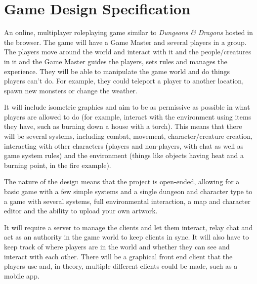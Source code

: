 \chapter{Game Design Specification}\label{appendix:designspec}

An online, multiplayer roleplaying game similar to \textit{Dungeons \& Dragons} hosted in the browser. The game will have a Game Master and several players in a group. The players move around the world and interact with it and the people/creatures in it and the Game Master guides the players, sets rules and manages the experience. They will be able to manipulate the game world and do things players can't do. For example, they could teleport a player to another location, spawn new monsters or change the weather.

It will include isometric graphics and aim to be as permissive as possible in what players are allowed to do (for example, interact with the environment using items they have, such as burning down a house with a torch). This means that there will be several systems, including combat, movement, character/creature creation, interacting with other characters (players and non-players, with chat as well as game system rules) and the environment (things like objects having heat and a burning point, in the fire example).

The nature of the design means that the project is open-ended, allowing for a basic game with a few simple systems and a single dungeon and character type to a game with several systems, full environmental interaction, a map and character editor and the ability to upload your own artwork.

It will require a server to manage the clients and let them interact, relay chat and act as an authority in the game world to keep clients in sync. It will also have to keep track of where players are in the world and whether they can see and interact with each other. There will be a graphical front end client that the players use and, in theory, multiple different clients could be made, such as a mobile app.